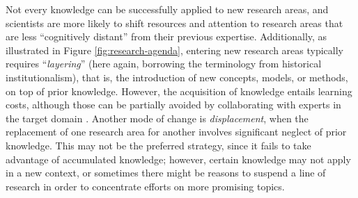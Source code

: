 \documentclass{article}
\begin{document}
Not every knowledge can be successfully applied to new research areas, and scientists are more likely to shift resources and attention to research areas that are less ``cognitively distant'' from their previous expertise. Additionally, as illustrated in Figure \ref{fig:research-agenda}, entering new research areas typically requires ``\textit{layering}'' (here again, borrowing the terminology from historical institutionalism), that is, the introduction of new concepts, models, or methods, on top of prior knowledge. However, the acquisition of knowledge entails learning costs, although those can be partially avoided by collaborating with experts in the target domain \citep{Tripodi2020}. Another mode of change is \textit{displacement}, when the replacement of one research area for another involves significant neglect of prior knowledge. %
This may not be the preferred strategy, since it fails to take advantage of accumulated knowledge; however, certain knowledge may not apply in a new context, or sometimes there might be reasons to suspend a line of research in order to concentrate efforts on more promising topics. 
\end{document}
